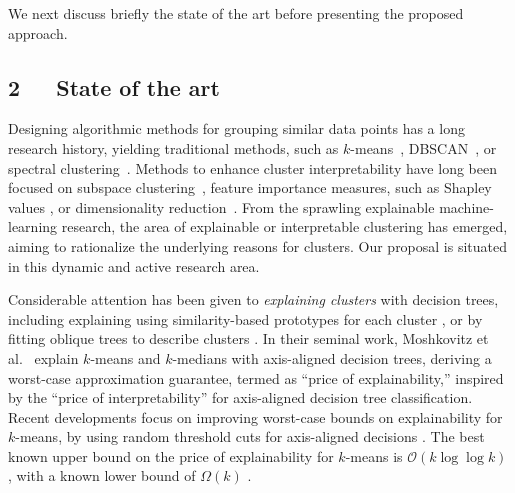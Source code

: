 \documentclass[a4paper,11pt]{article}
\begin{document}
\vspace{-2mm}
\noindent
We next discuss briefly the state of the art
before presenting the proposed approach.

\subsection*{2~~~State of the art}


Designing algorithmic methods for grouping similar data points has a long research history,
yielding traditional methods, 
such as $k$-means~\cite{macqueen1967some}, 
DBSCAN~\cite{ester1996ada}, or spectral clustering~\cite{ng2001spectral}.
Methods to enhance cluster interpretability have long been focused on subspace clustering~\cite{rubinstein2010dict}, 
feature importance measures, such as Shapley values \cite{lundberg2017unified}, 
or dimensionality reduction~\cite{hinton2002tsne,mcinnes2018umap}.
From the sprawling explainable machine-learning research, the area of explainable or interpretable clustering has emerged, aiming to rationalize the underlying reasons for clusters. 
Our proposal is situated in this dynamic and active research area. 

Considerable attention has been given to \emph{explaining clusters} with decision trees, 
including explaining using similarity-based prototypes for each cluster \cite{carrizosa2022interpreting}, 
or by fitting oblique trees to describe clusters \cite{gabidolla2022optimal}.
In their seminal work, Moshkovitz et al.~\cite{moshkovitz2020explainable} 
explain $k$-means and $k$-medians with axis-aligned decision trees, 
deriving a worst-case approximation guarantee, termed as ``price of explainability,'' 
inspired by the ``price of interpretability'' \cite{bertsimas2019price} for axis-aligned decision tree classification. 
Recent developments focus on improving worst-case bounds on explainability for $k$-means, 
by using random threshold cuts for axis-aligned decisions 
\cite{esfandiari2022almost, makarychev2022explainable}. 
The best known upper bound on the price of explainability for $k$-means is 
$\mathcal{O}(k \log \log k)$ \cite{gupta2023price}, 
with a known lower bound of $\Omega(k)$ \cite{gamlath2021explainable}.
\end{document}
